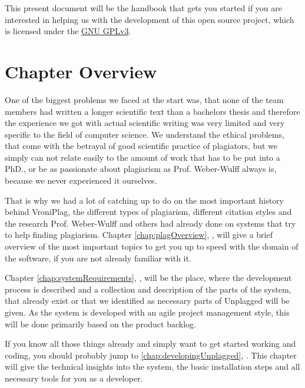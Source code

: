 This present document will be the handbook that gets you started if you are interested in helping us with the development of this 
open source project, which is licensed under the \href{http://www.gnu.org/licenses/quick-guide-gplv3}{GNU GPLv3}.

\section*{Chapter Overview}

One of the biggest problems we faced at the start was, that none of the team members had written a longer scientific
text than a bachelors
thesis and therefore the experience we got with actual scientific writing was very limited and very specific to the 
field of computer science. We understand the ethical problems, that come with the betrayal of 
good scientific practice of plagiators, but we simply can not relate easily to the amount of work that has to be put into 
a PhD., or be as 
passionate about plagiarism as Prof. Weber-Wulff always is, because we never experienced it ourselves.

That is why we had a lot of catching up to do on the most important history behind VroniPlag, the different types
of plagiarism, different citation styles and the research Prof. Weber-Wulff and others had already done on systems that try to 
help finding plagiarism. Chapter \ref{chap:plagOverview}, , will
give a brief overview of the most important topics to get you up to speed with the domain of the software, if you are
not already familiar with it.

Chapter \ref{chap:systemRequirements}, , will be the place, where the development process is described and a collection and description 
of the parts of the system, that already exist or that we identified as 
necessary parts of Unplagged will be given. As the system is developed with an agile project management style, this will be done
primarily based on the product backlog.

If you know all those things already and simply want to get started working and coding, you should probably jump
to \ref{chap:developingUnplagged}, . This chapter will give the technical insights into the system, the basic installation
steps and all necessary tools for you as a developer.


